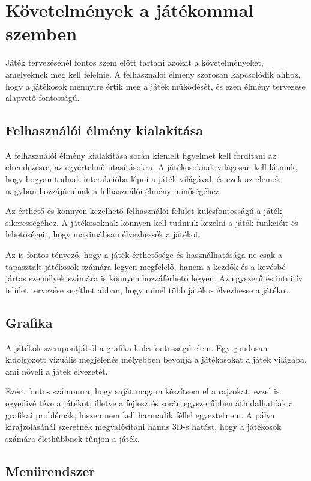 \chapter{Követelmények a játékommal szemben}
 Játék tervezésénél fontos szem előtt tartani azokat a követelményeket, amelyeknek meg kell felelnie. A felhasználói élmény szorosan kapcsolódik ahhoz, hogy a játékosok mennyire értik meg a játék működését, és ezen élmény tervezése alapvető fontosságú.


\section{Felhasználói élmény kialakítása}

 A felhasználói élmény kialakítása során kiemelt figyelmet kell fordítani az elrendezésre, az egyértelmű utasításokra. A játékosoknak világosan kell látniuk, hogy hogyan tudnak interakcióba lépni a játék világával, és ezek az elemek nagyban hozzájárulnak a felhasználói élmény minőségéhez.

Az érthető és könnyen kezelhető felhasználói felület kulcsfontosságú a játék sikerességéhez. A játékosoknak könnyen kell tudniuk kezelni a játék funkcióit és lehetőségeit, hogy maximálisan élvezhessék a játékot.

Az is fontos tényező, hogy a játék érthetősége és használhatósága ne csak a tapasztalt játékosok számára legyen megfelelő, hanem a kezdők és a kevésbé jártas személyek számára is könnyen hozzáférhető legyen. Az egyszerű és intuitív felület tervezése segíthet abban, hogy minél több játékos élvezhesse a játékot.


\section{Grafika}

 A játékok szempontjából a grafika kulcsfontosságú elem. Egy gondosan kidolgozott vizuális megjelenés mélyebben bevonja a játékosokat a játék világába, ami növeli a játék élvezetét.

Ezért fontos számomra, hogy saját magam készítsem el a rajzokat, ezzel is egyedivé téve a játékot, illetve a fejlesztés során egyszerűbben áthidalhatóak a grafikai problémák, hiszen nem kell harmadik féllel egyeztetnem. A pálya kirajzolásánál szeretnék megvalósítani hamis 3D-s hatást, hogy a játékosok számára élethűbbnek tűnjön a játék. 


\section{Menürendszer}

